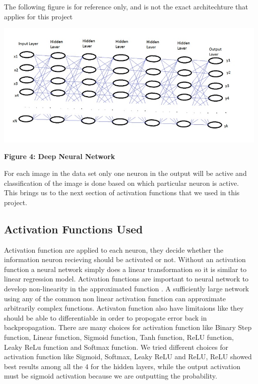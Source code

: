 The following figure is for reference only, and is not the exact architechture
that applies for this project

\begin{center}
\includegraphics[scale=0.25]{images/neural-network.jpeg}
\label{s:Deep Neural Network}
\end{center}
\textbf{Figure 4: Deep Neural Network
~\cite{hid-sp18-401-Neural-Network-image}}


For each image in the data set only one neuron in the output will be active
and classification of the image is done based on which particular neuron is
active. This brings us to the next section of activation functions that we
used in this project.



\subsection{Activation Functions Used}

Activation function are applied to each neuron, they decide whether the
information neuron recieving should be activated or not. Without an activation
function a neural network simply does a linear transformation so it is similar
to linear regression model. Activation functions are important to neural
network to develop non-linearity in the approximated function . A sufficiently
large network using any of the common non linear activation function can
approximate arbitrarily complex functions. Activaton function also have
limitaions like they should be able to differentiable in order to propogate
error back in backpropagation. There are many choices for activation function
like Binary Step function, Linear function, Sigmoid function, Tanh function,
ReLU function, Leaky ReLu function and Softmax function. We tried different
choices for activation function like Sigmoid, Softmax, Leaky ReLU and ReLU,
ReLU showed best results among all the 4 for the hidden layers, while the
output activation must be sigmoid activation because we are outputting the
probability. 

